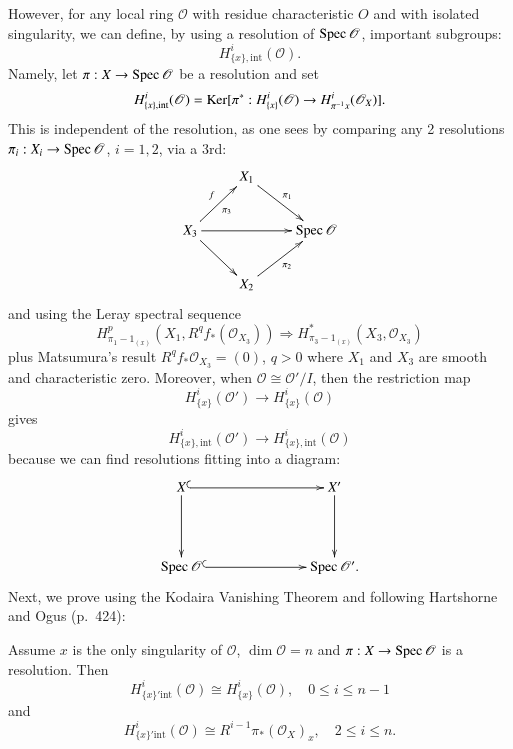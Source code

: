 However, for any local ring $\mathscr{O}$ with residue characteristic
$O$ and with isolated singularity, we can define, by using a
resolution of $\operatorname{Spec} \mathscr{O}$, important subgroups:
$$
H^{i}_{\{x\},\text{int}}(\mathscr{O}).
$$
Namely, let $\pi:X\to \operatorname{Spec} \mathscr{O}$ be a resolution and set
$$
H^{i}_{\{x\},\text{int}}(\mathscr{O})=\operatorname{Ker}[\pi^{*}:H^{i}_{\{x\}}(\mathscr{O})\to
H^{i}_{\pi^{-1}x}(\mathscr{O}_{X})].
$$
This is independent of the resolution, as one sees by comparing any 2
resolutions $\pi_{i}:X_{i}\to \operatorname{Spec} \mathscr{O}$, $i=1,2$, via a 3rd:
\[
\xymatrix{
 & X_{1}\ar[dr]^-{\pi_{1}} &\\
X_{3}\ar[ur]^-{f}_-{\pi_{3}}\ar[rr]\ar[dr] & & \Spec\mathscr{O}\\
 & X_{2}\ar[ur]_-{\pi_{2}} & 
}
\]
and using the Leray spectral sequence
$$
H^{p}_{\pi_{1}-1_{(x)}}(X_{1},R^{q}f_{*}(\mathscr{O}_{X_{3}}))\Rightarrow
H^{*}_{\pi_{3}-1_{(x)}}(X_{3},\mathscr{O}_{X_{3}}) 
$$
plus Matsumura's result $R^{q}f_{*}\mathscr{O}_{X_{3}}=(0)$, $q>0$
where $X_{1}$ and $X_{3}$ are smooth and characteristic
zero. Moreover, when $\mathscr{O}\cong \mathscr{O}'/I$, then the
restriction map
$$
H^{i}_{\{x\}}(\mathscr{O}')\to H^{i}_{\{x\}}(\mathscr{O}) 
$$
gives\pageoriginale
$$
H^{i}_{\{x\},\text{int}}(\mathscr{O}')\to
H^{i}_{\{x\},\text{int}}(\mathscr{O}) 
$$
because we can find resolutions fitting into a diagram:
\[
\xymatrix@C=2.5cm@R=1.5cm{
X\ar@{^(->}[r]\ar[d] & X'\ar[d]\\
\Spec \mathscr{O}\ar@{^(->}[r] & \Spec \mathscr{O}'.
}
\]
Next, we prove using the Kodaira Vanishing Theorem and following
Hartshorne and Ogus (\cite{art01-key16}p.~424):

\begin{lemma*}
Assume $x$ is the only singularity of $\mathscr{O}$,
$\dim \mathscr{O}=n$ and $\pi:X\to \operatorname{Spec} \mathscr{O}$ is a
resolution. Then
$$
H^{i}_{\{x\}'\text{int}}(\mathscr{O})\cong
H^{i}_{\{x\}}(\mathscr{O}),\quad 0\leq i\leq n-1
$$
and
$$
H^{i}_{\{x\}'\text{int}}(\mathscr{O})\cong
R^{i-1}\pi_{*}(\mathscr{O}_{X})_{x},\quad 2\leq i\leq n.
$$
\end{lemma*}

